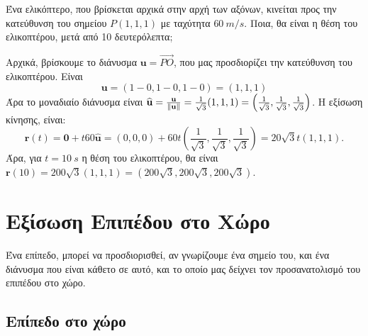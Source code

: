 \begin{example}
  Ένα ελικόπτερο, που βρίσκεται αρχικά στην αρχή των αξόνων, κινείται προς την
  κατεύθυνση του σημείου $P(1,1,1) $ με ταχύτητα $ \SI{60}{m/s} $. Ποια, θα είναι 
  η θέση του ελικοπτέρου, μετά από 10 δευτερόλεπτα;
\end{example}
\begin{solution}
  Αρχικά, βρίσκουμε το διάνυσμα $ \mathbf{u} = \vec{PO} $, που μας προσδιορίζει την
  κατεύθυνση του ελικοπτέρου. Είναι
  \[ \mathbf{u} = (1-0,1-0,1-0) = (1,1,1) \]
  Άρα το μοναδιαίο διάνυσμα είναι $ \mathbf{\widehat{u}} =
  \frac{\mathbf{u}}{\norm{\mathbf{u}}} = \frac{1}{\sqrt{3}} (1,1,1) =
  \left(\frac{1}{\sqrt{3}} , \frac{1}{\sqrt{3}} , \frac{1}{\sqrt{3}}\right) $. Η εξίσωση
  κίνησης, είναι:
  \[
    \mathbf{r}(t) = \mathbf{0} + t 60 \mathbf{\widehat{u}} = (0,0,0) + 60t 
    \left(\frac{1}{\sqrt{3}} , \frac{1}{\sqrt{3}} , \frac{1}{\sqrt{3}}\right) = 
    20 \sqrt{3} t (1,1,1).
  \] 
  Άρα, για $ t= \SI{10}{s} $ η θέση του ελικοπτέρου, θα είναι $ \mathbf{r}(10) = 200
  \sqrt{3} (1,1,1) = (200 \sqrt{3} , 200 \sqrt{3} , 200 \sqrt{3}) $. 
\end{solution}

\chapter*{Εξίσωση Επιπέδου στο Χώρο}



Ένα επίπεδο, μπορεί να προσδιορισθεί, αν γνωρίζουμε ένα σημείο του, και ένα 
διάνυσμα που είναι κάθετο σε αυτό, και το οποίο μας δείχνει τον προσανατολισμό του 
επιπέδου στο χώρο.

\section*{Επίπεδο στο χώρο}


